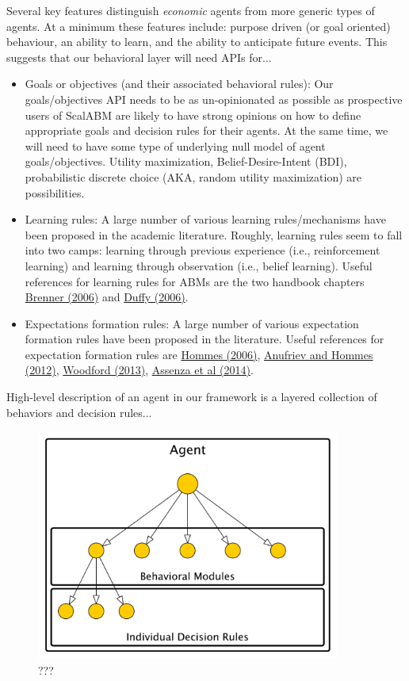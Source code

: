\documentclass[11pt]{amsart}
\begin{document}
Several key features distinguish \textit{economic} agents from more generic types of agents. At a minimum these features include: purpose driven (or goal oriented) behaviour, an ability to learn, and the ability to anticipate future events. This suggests that our behavioral layer will need APIs for...
\begin{itemize}
    \item Goals or objectives (and their associated behavioral rules): Our goals/objectives API needs to be as un-opinionated as possible as prospective users of ScalABM are likely to have strong opinions on how to define appropriate goals and decision rules for their agents. At the same time, we will need to have some type of underlying null model of agent goals/objectives. Utility maximization, Belief-Desire-Intent (BDI), probabilistic discrete choice (AKA, random utility maximization) are possibilities.
    \item Learning rules: A large number of various learning rules/mechanisms have been proposed in the academic literature. Roughly, learning rules seem to fall into two camps: learning through previous experience (i.e., reinforcement learning) and learning through observation (i.e., belief learning). Useful references for learning rules for ABMs are the two handbook chapters \href{http://web.uvic.ca/~mingkang/econ353/project/Brenner.pdf}{Brenner (2006)} and \href{http://www.socsci.uci.edu/~duffy/papers/duffy2006.pdf}{Duffy (2006)}.
    \item Expectations formation rules: A large number of various expectation formation rules have been proposed in the literature. Useful references for expectation formation rules are \href{http://feb.kuleuven.be/fac/Slides_Degrauwe/HomHBchapter23.pdf}{Hommes (2006)}, \href{http://econ.columbia.edu/files/econ/content/hommes_background_material_2.pdf}{Anufriev and Hommes (2012)}, \href{http://www.columbia.edu/~mw2230/AREcon.pdf}{Woodford (2013)}, \href{http://www.emeraldinsight.com/doi/pdfplus/10.1108/S0193-230620140000017002}{Assenza et al (2014)}.
\end{itemize}

High-level description of an agent in our framework is a layered collection of behaviors and decision rules...
\begin{figure}[H]
\centering
\includegraphics[width=10cm]{img/hierarchical-actor.pdf}
\caption{???}
\end{figure}
\end{document}
